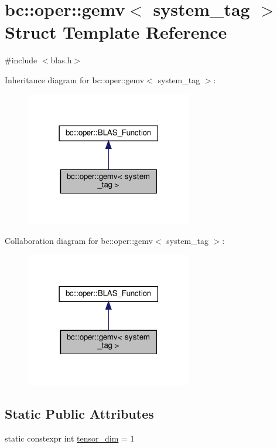 \hypertarget{structbc_1_1oper_1_1gemv}{}\section{bc\+:\+:oper\+:\+:gemv$<$ system\+\_\+tag $>$ Struct Template Reference}
\label{structbc_1_1oper_1_1gemv}


{\ttfamily \#include $<$blas.\+h$>$}



Inheritance diagram for bc\+:\+:oper\+:\+:gemv$<$ system\+\_\+tag $>$\+:\nopagebreak
\begin{figure}[H]
\begin{center}
\leavevmode
\includegraphics[width=206pt]{structbc_1_1oper_1_1gemv__inherit__graph}
\end{center}
\end{figure}


Collaboration diagram for bc\+:\+:oper\+:\+:gemv$<$ system\+\_\+tag $>$\+:\nopagebreak
\begin{figure}[H]
\begin{center}
\leavevmode
\includegraphics[width=206pt]{structbc_1_1oper_1_1gemv__coll__graph}
\end{center}
\end{figure}
\subsection*{Static Public Attributes}
\begin{DoxyCompactItemize}
\item 
static constexpr int \hyperlink{structbc_1_1oper_1_1gemv_a0d6a305d67924dfb796996252a18eedc}{tensor\+\_\+dim} = 1
\end{DoxyCompactItemize}

